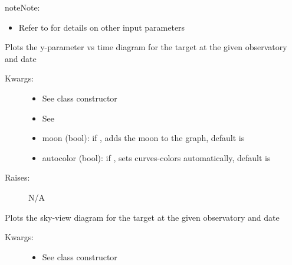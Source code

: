 \documentclass[letterpaper,10pt,english]{sphinxmanual}
\begin{document}
\begin{fulllineitems}
\begin{fulllineitems}
\begin{description}
\end{description}

\begin{notice}{note}{Note:}\begin{itemize}
\item {} 
Refer to  for details on other input parameters

\end{itemize}
\end{notice}

\end{fulllineitems}


\begin{fulllineitems}
\label{astroobs:astroobs.Observation.plot}
Plots the y-parameter vs time diagram for the target at the given observatory and date
\begin{description}
\item[{Kwargs:}] \leavevmode\begin{itemize}
\item {} 
See class constructor

\item {} 
See 

\item {} 
moon (bool): if , adds the moon to the graph, default is 

\item {} 
autocolor (bool): if , sets curves-colors automatically, default is 

\end{itemize}

\item[{Raises:}] \leavevmode
N/A

\end{description}

\end{fulllineitems}


\begin{fulllineitems}
\label{astroobs:astroobs.Observation.polar}
Plots the sky-view diagram for the target at the given observatory and date
\begin{description}
\item[{Kwargs:}] \leavevmode\begin{itemize}
\item {} 
See class constructor


\end{itemize}
\end{description}
\end{fulllineitems}
\end{fulllineitems}
\end{document}

